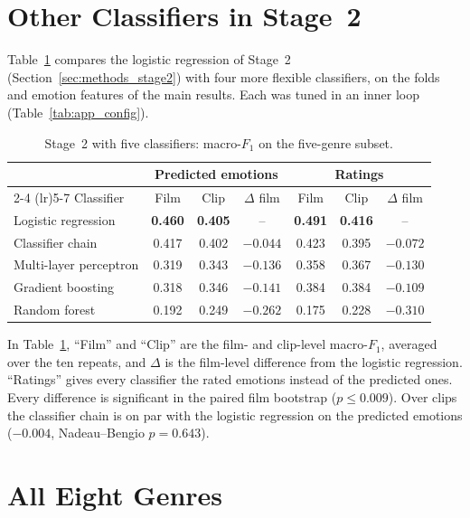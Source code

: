 \section{Other Classifiers in Stage~2}
\label{sec:app_stage2}

Table~\ref{tab:app_stage2} compares the logistic regression of Stage~2
(Section~\ref{sec:methods_stage2}) with four more flexible classifiers, on the folds and
emotion features of the main results. Each was tuned in an inner loop
(Table~\ref{tab:app_config}).

\begin{table}[H]
  \centering
  \small
  \caption{Stage~2 with five classifiers: macro-$F_1$ on the five-genre subset.}
  \label{tab:app_stage2}
  \begin{tabular}{lcccccc}
    \toprule
    & \multicolumn{3}{c}{Predicted emotions} & \multicolumn{3}{c}{Ratings} \\
    \cmidrule(lr){2-4} \cmidrule(lr){5-7}
    Classifier & Film & Clip & $\Delta$ film & Film & Clip & $\Delta$ film \\
    \midrule
    Logistic regression & \textbf{0.460} & \textbf{0.405} & -- & \textbf{0.491} & \textbf{0.416} & -- \\
    Classifier chain & 0.417 & 0.402 & $-0.044$ & 0.423 & 0.395 & $-0.072$ \\
    Multi-layer perceptron & 0.319 & 0.343 & $-0.136$ & 0.358 & 0.367 & $-0.130$ \\
    Gradient boosting & 0.318 & 0.346 & $-0.141$ & 0.384 & 0.384 & $-0.109$ \\
    Random forest & 0.192 & 0.249 & $-0.262$ & 0.175 & 0.228 & $-0.310$ \\
    \bottomrule
  \end{tabular}
\end{table}

In Table~\ref{tab:app_stage2}, ``Film'' and ``Clip'' are the film- and clip-level
macro-$F_1$, averaged over the ten repeats, and $\Delta$ is the film-level difference from
the logistic regression. ``Ratings'' gives every classifier the rated emotions instead of
the predicted ones. Every difference is significant in the paired film bootstrap
($p\le0.009$). Over clips the classifier chain is on par with the logistic regression on the predicted
emotions ($-0.004$, Nadeau--Bengio $p=0.643$).

\section{All Eight Genres}
\label{sec:app_eight}

